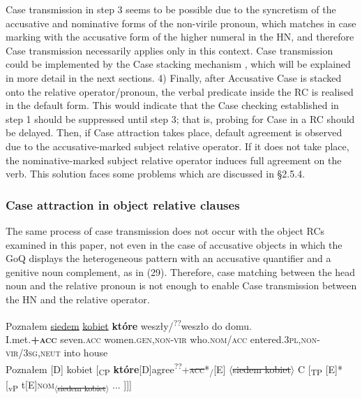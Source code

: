 \documentclass[output=paper]{langsci/langscibook}
\begin{document}
Case transmission in step 3 seems to be possible due to the syncretism of the accusative and nominative forms of the non-virile pronoun, which matches in case marking with the accusative form of the higher numeral in the HN, and therefore Case transmission necessarily applies only in this context. Case transmission could be implemented by the Case stacking mechanism \citep{Vogel2001}, which will be explained in more detail in the next sections. 4) Finally, after Accusative Case is stacked onto the relative operator\slash pronoun, the verbal predicate inside the RC is realised in the default form. This would indicate that the Case checking established in step 1 should be suppressed until step 3; that is, probing for Case in a RC should be delayed. Then, if Case attraction takes place, default agreement is observed due to the accusative-marked subject relative operator. If it does not take place, the nominative-marked subject relative operator induces full agreement on the verb. This solution faces some problems which are discussed in §2.5.4.

\subsubsection{Case attraction in object relative clauses}%

The same process of case transmission does not occur with the object RCs examined in this paper, not even in the case of accusative objects in which the GoQ displays the heterogeneous pattern with an accusative quantifier and a genitive noun complement, as in (29). Therefore, case matching between the head noun and the relative pronoun is not enough to enable Case transmission between the HN and the relative operator.

\ea\label{ex:leska:29}
\gll Poznałem \ul{siedem}     \ul{kobiet}     \textbf{które} weszły/\textsuperscript{??}weszło   do   domu.\\
     I.met.\textbf{\textsc{+acc}} seven.\textsc{acc}   women.\textsc{gen,non-vir}  who.\textsc{nom/acc}    entered.\textsc{3pl,non-vir/3sg,neut}  into house\\
\glt Poznałem [D] kobiet [\textsubscript{CP} \textbf{które}[D]{agree\textsuperscript{??}+\textsc{\sout{acc}}}*\textsubscript{\slash}[E] $\langle$\sout{siedem kobiet}$\rangle$ C [\textsubscript{TP} [E]* [\textsubscript{vP} t[E]{\footnotesize\textsc{nom}}\textsubscript{$\langle$\sout{siedem kobiet}$\rangle$} ... ]]]
\z
\end{document}
